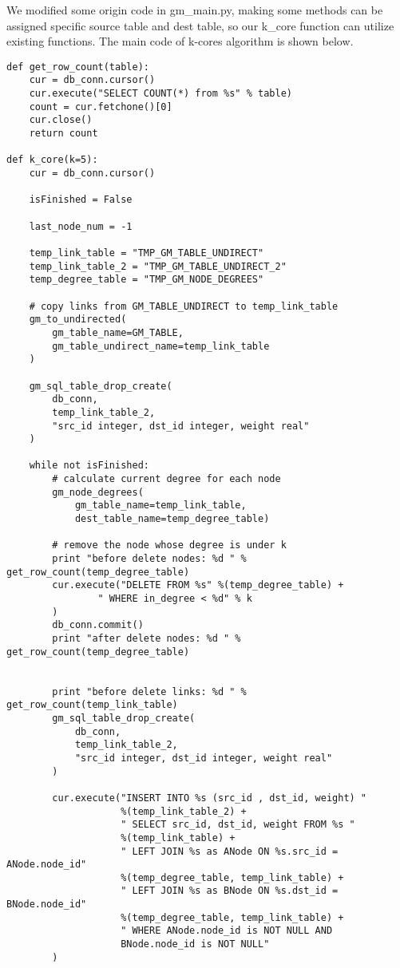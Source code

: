 We modified some origin code in gm\_main.py, making some methods can be assigned specific source table and dest table, so our k\_core function can utilize existing functions. The main code of k-cores algorithm is shown below.

\begin{lstlisting}
def get_row_count(table):
    cur = db_conn.cursor()
    cur.execute("SELECT COUNT(*) from %s" % table)
    count = cur.fetchone()[0]
    cur.close()
    return count

def k_core(k=5):
    cur = db_conn.cursor()

    isFinished = False

    last_node_num = -1

    temp_link_table = "TMP_GM_TABLE_UNDIRECT"
    temp_link_table_2 = "TMP_GM_TABLE_UNDIRECT_2"
    temp_degree_table = "TMP_GM_NODE_DEGREES"

    # copy links from GM_TABLE_UNDIRECT to temp_link_table
    gm_to_undirected(
        gm_table_name=GM_TABLE,
        gm_table_undirect_name=temp_link_table
    )

    gm_sql_table_drop_create(
        db_conn,
        temp_link_table_2,
        "src_id integer, dst_id integer, weight real"
    )

    while not isFinished:
        # calculate current degree for each node
        gm_node_degrees(
            gm_table_name=temp_link_table,
            dest_table_name=temp_degree_table)

        # remove the node whose degree is under k
        print "before delete nodes: %d " % get_row_count(temp_degree_table)
        cur.execute("DELETE FROM %s" %(temp_degree_table) +
                " WHERE in_degree < %d" % k
        )
        db_conn.commit()
        print "after delete nodes: %d " % get_row_count(temp_degree_table)


        print "before delete links: %d " % get_row_count(temp_link_table)
        gm_sql_table_drop_create(
            db_conn,
            temp_link_table_2,
            "src_id integer, dst_id integer, weight real"
        )

        cur.execute("INSERT INTO %s (src_id , dst_id, weight) " 
        			%(temp_link_table_2) +
                    " SELECT src_id, dst_id, weight FROM %s " 
                    %(temp_link_table) +
                    " LEFT JOIN %s as ANode ON %s.src_id = ANode.node_id" 
                    %(temp_degree_table, temp_link_table) +
                    " LEFT JOIN %s as BNode ON %s.dst_id = BNode.node_id" 
                    %(temp_degree_table, temp_link_table) +
                    " WHERE ANode.node_id is NOT NULL AND 
                    BNode.node_id is NOT NULL"
        )


\end{lstlisting}
